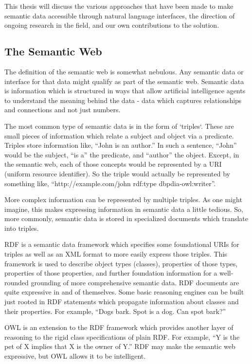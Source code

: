 \documentclass[11pt]{article}
\begin{document}
This thesis will discuss the various approaches that have been made to make
semantic data accessible through natural language interfaces, the direction of ongoing
research in the field, and our own contributions to the solution.

\subsection{The Semantic Web}

The definition of the semantic web is somewhat nebulous. Any semantic
data or interface for that data might qualify as part of the semantic web.
Semantic data is information which is structured in ways that allow artificial
intelligence agents to understand the meaning behind the data - data which
captures relationships and connections and not just numbers. 

The most common type of semantic data is in the form of `triples`. These are
small pieces of information which relate a subject and object via a predicate.
Triples store information like, ``John is an author.'' In such a sentence,
``John'' would be the subject, ``is a'' the predicate, and ``author'' the object.
Except, in the semantic web, each of those concepts would be represented
by a URI (uniform resource identifier). So the triple would actually be
represented by something like, ``http://example.com/john rdf:type dbpdia-owl:writer''.

More complex information can be represented by multiple triples. As one might
imagine, this makes expressing information in semantic data a little tedious.
So, more commonly, semantic data is stored in specialized documents which 
translate into triples.

RDF\cite{rdf} is a semantic data framework which specifies some foundational URIs for triples
as well as an XML format to more easily express those triples. This framework
is used to describe object types (classes), properties of those types, properties
of those properties, and further foundation information for a well-rounded
grounding of more comprehensive semantic data. 
RDF documents are quite expressive in and of themselves.
Some basic reasoning engines can be built just rooted in RDF statements 
which propagate information about classes and their properties. For example, 
``Dogs bark. Spot is a dog. Can spot bark?''

OWL\cite{owl} is an extension to the RDF framework which provides another layer
of reasoning to the rigid class specifications of plain RDF. For example,
``Y is the pet of X implies that X is the owner of Y.''
RDF may make the semantic web expressive, but OWL allows it to be intelligent.
\end{document}
